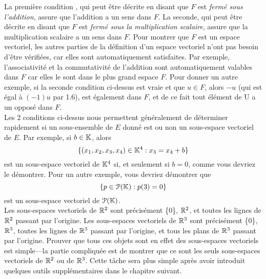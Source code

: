 \documentclass[12pt]{book}
\theoremstyle{plain}
\begin{document}
\noindent
La première condition {}, qui peut être décrite en disant que $F$ est \textit{fermé sous l'addition}, assure que l'addition a un sens dans $F$. La seconde, qui peut être décrite en disant que $F$ est \textit{fermé sous la multiplication scalaire}, assure que la multiplication scalaire a un sens dans $F$. Pour montrer que $F$ est un espace vectoriel, les autres parties de la définition d'un espace vectoriel n'ont pas besoin d’être vérifiées, car elles sont automatiquement satisfaites. Par exemple, l'associativité et la commutativité de l'addition sont automatiquement valables dans $F$ car elles le sont dans le plus grand espace $F$. Pour donner un autre exemple, si la seconde condition ci-dessus est vraie et que $u\in F$, alors $-u$ (qui est égal à $(-1)u$ par 1.6), est également dans $F$, et de ce fait tout élément de U a un opposé dans $F$.\\
\indent
Les 2 conditions ci-dessus nous permettent généralement de déterminer rapidement si un sous-ensemble de $E$ donné est ou non un sous-espace vectoriel de $E$. Par exemple, si $b\in\mathbb{K}$, alors
\begin{equation*}
    \{(x_1,x_2,x_3,x_4)\in\mathbb{K}^4:x_3=x_4+b\}
\end{equation*}
est un sous-espace vectoriel de $\mathbb{K}^4$ si, et seulement si $b=0$, comme vous devriez le démontrer. Pour un autre exemple, vous devriez démontrer que
\begin{equation*}
    \{p\in \mathcal{P}(\mathbb{K}):p(3)=0\}
\end{equation*}
est un sous-espace vectoriel de $\mathcal{P}(\mathbb{K})$.\\
\indent
Les sous-espaces vectoriels de $\mathbb{R}^2$ sont précisément \{0\}, $\mathbb{R}^2$, et toutes les lignes de $\mathbb{R}^2$ passant par l'origine. Les sous-espaces vectoriels de $\mathbb{R}^3$ sont précisément \{0\}, $\mathbb{R}^3$, toutes les lignes de $\mathbb{R}^3$ passant par l'origine, et tous les plans de $\mathbb{R}^3$ passant par l'origine. Prouver que tous ces objets sont en effet des sous-espaces vectoriels est simple---la partie compliquée est de montrer que ce sont les seuls sous-espaces vectoriels de $\mathbb{R}^2$ ou de $\mathbb{R}^3$. Cette tâche sera plus simple après avoir introduit quelques outils supplémentaires dans le chapitre suivant.
\end{document}
